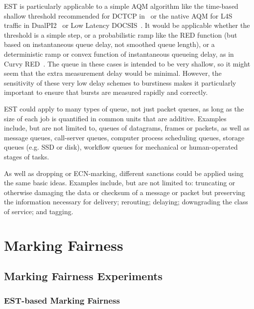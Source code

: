 EST is particularly applicable to a simple AQM algorithm like the time-based shallow threshold recommended for DCTCP in~\cite{Bai16:MQ-ECN} or the native AQM for L4S traffic in DualPI2~\cite[Appx.\ A]{Briscoe15e:DualQ-Coupled-AQM_ID} or Low Latency DOCSIS~\cite{CableLabs:DOCSIS3.1}. It would be applicable whether the threshold is a simple step, or a probabilistic ramp like the RED function (but based on instantaneous queue delay, not smoothed queue length), or a deterministic ramp or convex function of instantaneous queueing delay, as in Curvy RED~\cite[Appx.\ B]{Briscoe15e:DualQ-Coupled-AQM_ID}. The queue in these cases is intended to be very shallow, so it might seem that the extra measurement delay would be minimal. However, the sensitivity of these very low delay schemes to burstiness makes it particularly important to ensure that bursts are measured rapidly and correctly.

EST could apply to many types of queue, not just packet queues, as long as the size of each job is quantified in common units that are additive. Examples include, but are not limited to, queues of datagrams, frames or packets, as well as message queues, call-server queues, computer process scheduling queues, storage queues (e.g. SSD or disk), workflow queues for mechanical or human-operated stages of tasks. 

As well as dropping or ECN-marking, different sanctions could be applied using the same basic ideas. Examples include, but are not limited to: truncating or otherwise damaging the data or checksum of a message or packet but preserving the information necessary for delivery; rerouting; delaying; downgrading the class of service; and tagging.

\section{Marking Fairness}\label{sec:marking_fairness_discuss}

\subsection{Marking Fairness Experiments}\label{sec:marking_fairness_expts}

\subsubsection{EST-based Marking Fairness}\label{sec:marking_fairness_expts_est}

